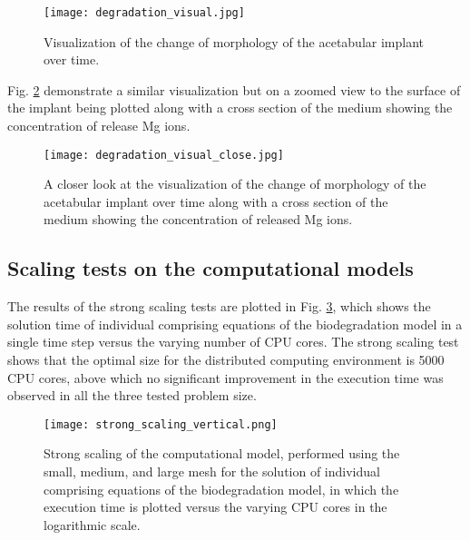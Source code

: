 \begin{figure}[h]
\centering
\medskip
\texttt{[image: degradation\_visual.jpg]}
\caption[Visualization of the change of morphology of the acetabular implant]{Visualization of the change of morphology of the acetabular implant over time.} \label{fig:cup_degradation_visual}
\end{figure}

Fig. \ref{fig:cup_degradation_visual_close} demonstrate a similar visualization but on a zoomed view to the surface of the implant being plotted along with a cross section of the medium showing the concentration of release Mg ions. 

\begin{figure}[h]
\centering
\medskip
\texttt{[image: degradation\_visual\_close.jpg]}
\caption[Visualization of the change of morphology of the acetabular implant]{A closer look at the visualization of the change of morphology of the acetabular implant over time along with a cross section of the medium showing the concentration of released Mg ions.} \label{fig:cup_degradation_visual_close}
\end{figure}

\subsection{Scaling tests on the computational models}

The results of the strong scaling tests are plotted in Fig. \ref{fig:cup_strong_scaling}, which shows the solution time of individual comprising equations of the biodegradation model in a single time step versus the varying number of CPU cores. The strong scaling test shows that the optimal size for the distributed computing environment is \num{5000} CPU cores, above which no significant improvement in the execution time was observed in all the three tested problem size.

\begin{figure}[h]
\centering
\medskip
\texttt{[image: strong\_scaling\_vertical.png]}
\caption[Strong scaling of individual components of the biodegradation model]{Strong scaling of the computational model, performed using the small, medium, and large mesh for the solution of individual comprising equations of the biodegradation model, in which the execution time is plotted versus the varying CPU cores in the logarithmic scale.} \label{fig:cup_strong_scaling}
\end{figure}

